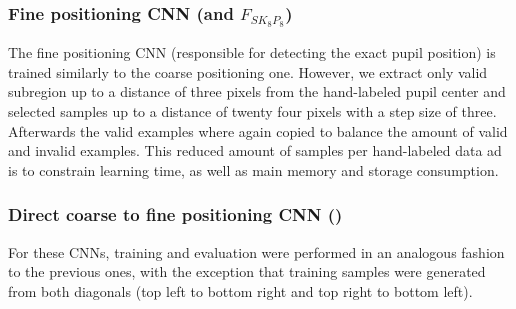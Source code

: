 \subsubsection{Fine positioning CNN (\cfin and $F_{SK_8P_8}$)}
The fine positioning CNN (responsible for detecting the exact pupil position) is
trained similarly to the coarse positioning one.
However, we extract only valid subregion up to a distance of three pixels from the hand-labeled
pupil center and selected samples up to a distance of twenty four pixels with a step size of three.  Afterwards the valid examples where again copied to balance the amount of valid and invalid examples. This reduced amount of samples per hand-labeled data ad is to constrain learning time, as well as main memory and storage consumption.

\subsubsection{Direct coarse to fine positioning CNN (\csin{})}
\label{subsec:trainingdirect}

For these CNNs, training and evaluation were performed in an analogous fashion
to the previous ones, with the exception that training samples were generated
from both diagonals (top left to bottom right and top right to bottom left).

